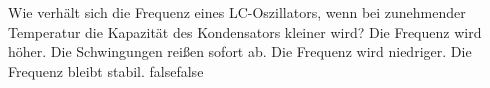     {Wie verhält sich die Frequenz eines LC-Oszillators, wenn bei zunehmender Temperatur die Kapazität des Kondensators kleiner wird?}
    {Die Frequenz wird höher.}
    {Die Schwingungen reißen sofort ab.}
    {Die Frequenz wird niedriger.}
    {Die Frequenz bleibt stabil.}
    {false}{false}